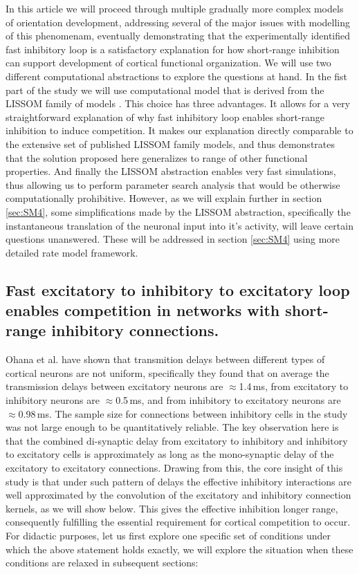 \documentclass[a4paper,10pt]{article}
\begin{document}
In this article we will proceed through multiple gradually more complex models of orientation development, addressing several 
of the major issues with modelling of this phenomenam, eventually demonstrating that the experimentally identified fast inhibitory loop is a satisfactory explanation for how short-range inhibition can support development of cortical functional organization. We will use two different computational abstractions to explore the questions at hand. In the fist part of the study we will use computational model that is derived from the LISSOM family of models \cite{CMVC}. This choice has three advantages. It allows for a very straightforward explanation of why 
fast inhibitory loop enables short-range inhibition to induce competition. It makes our explanation directly comparable to the 
extensive set of published LISSOM family models, and thus demonstrates that the solution proposed here generalizes to range of other 
functional properties. And finally the LISSOM abstraction enables very fast simulations, thus allowing us to perform 
parameter search analysis that would be otherwise computationally prohibitive. However, as we will explain further in section \ref{sec:SM4}, some simplifications made by the LISSOM abstraction, specifically the instantaneous translation of the neuronal input into it's activity, will leave 
certain questions unanswered. These will be addressed in section \ref{sec:SM4} using more detailed rate model framework.


\subsection{Fast excitatory to inhibitory to excitatory loop enables competition in networks with short-range inhibitory connections.} \label{sec:SM1}

Ohana et al. \cite{Ohana2012} have shown that transmition delays between different types of cortical neurons are not uniform, specifically they found that on average the transmission delays  between excitatory neurons are $\approx$1.4\,ms, from excitatory to inhibitory neurons are $\approx$0.5\,ms, and from inhibitory to excitatory neurons are $\approx$0.98\,ms. The sample size for connections
between inhibitory cells in the study was not large enough to be quantitatively reliable. The key observation here is that the 
combined di-synaptic delay from excitatory to inhibitory and inhibitory to excitatory cells is approximately as long as the mono-synaptic delay
of the excitatory to excitatory connections. Drawing from this, the core insight of this study is that under such pattern of delays
the effective inhibitory interactions are well approximated by the convolution of the excitatory and inhibitory connection kernels, as we will
show below. This gives the effective inhibition longer range, consequently fulfilling the essential requirement for cortical competition to occur.
For didactic purposes, let us first explore one specific set of conditions under which the above statement holds exactly, we will explore the 
situation when these conditions are relaxed in subsequent sections: 
\end{document}
